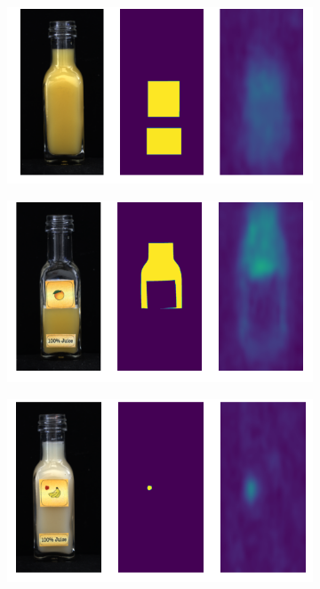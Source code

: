 \begin{figure}[htbp]
    \captionsetup[subfigure]{justification=centering}
    \centering
    \begin{subfigure}[b]{0.3\textwidth}
        \centering
        \includegraphics[width=\textwidth]{figures/locosimplenetresults/JB/image_prediction_105.png}

    \end{subfigure}
    \begin{subfigure}[b]{0.3\textwidth}
        \centering
        \includegraphics[width=\textwidth]{figures/locosimplenetresults/JB/image_prediction_188.png}

    \end{subfigure}
    \begin{subfigure}[b]{0.3\textwidth}
        \centering
        \includegraphics[width=\textwidth]{figures/locosimplenetresults/JB/image_prediction_258.png}


\end{subfigure}
\end{figure}
